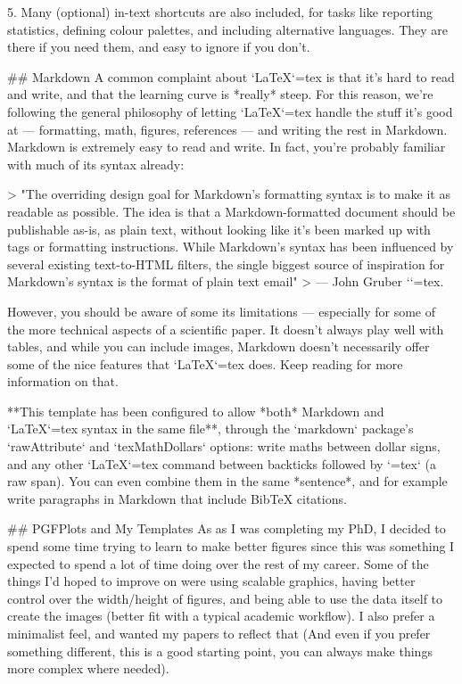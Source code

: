 \begin{markdown}
5. Many (optional) in-text shortcuts are also included, for tasks like reporting statistics, defining colour palettes, and including alternative languages. They are there if you need them, and easy to ignore if you don't. 



## Markdown
A common complaint about `\LaTeX{}`{=tex} is that it's hard to read and write, and that the learning curve is *really* steep. For this reason, we're following the general philosophy of letting `\LaTeX{}`{=tex} handle the stuff it's good at --- formatting, math, figures, references --- and writing the rest in Markdown. Markdown is extremely easy to read and write. In fact, you're probably familiar with much of its syntax already: 

>    "The overriding design goal for Markdown’s formatting syntax is to make it as readable as possible. The idea is that a Markdown-formatted document should be publishable as-is, as plain text, without looking like it’s been marked up with tags or formatting instructions. While Markdown’s syntax has been influenced by several existing text-to-HTML filters, the single biggest source of inspiration for Markdown’s syntax is the format of plain text email"
> --- John Gruber `\citep{gruber2006}`{=tex}.

However, you should be aware of some its limitations --- especially for some of the more technical aspects of a scientific paper. It doesn't always play well with tables, and while you can include images, Markdown doesn't necessarily offer some of the nice features that `\LaTeX{}`{=tex} does. Keep reading for more information on that. 

**This template has been configured to allow *both* Markdown and `\LaTeX{}`{=tex} syntax in the same file**, through the `markdown` package's `rawAttribute` and `texMathDollars` options: write maths between dollar signs, and any other `\LaTeX{}`{=tex} command between backticks followed by `{=tex}` (a raw span). You can even combine them in the same *sentence*, and for example write paragraphs in Markdown that include BibTeX citations.



## PGFPlots and My Templates 
As as I was completing my PhD, I decided to spend some time trying to learn to make better figures since this was something I expected to spend a lot of time doing over the rest of my career. Some of the things I'd hoped to improve on were using scalable graphics, having better control over the width/height of figures, and being able to use the data itself to create the images (better fit with a typical academic workflow). I also prefer a minimalist feel, and wanted my papers to reflect that (And even if you prefer something different, this is a good starting point, you can always make things more complex where needed). 


\end{markdown}
